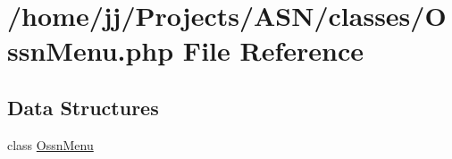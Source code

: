\hypertarget{_ossn_menu_8php}{}\section{/home/jj/\+Projects/\+A\+S\+N/classes/\+Ossn\+Menu.php File Reference}
\label{_ossn_menu_8php}
\subsection*{Data Structures}
\begin{DoxyCompactItemize}
\item 
class \hyperlink{class_ossn_menu}{Ossn\+Menu}
\end{DoxyCompactItemize}
